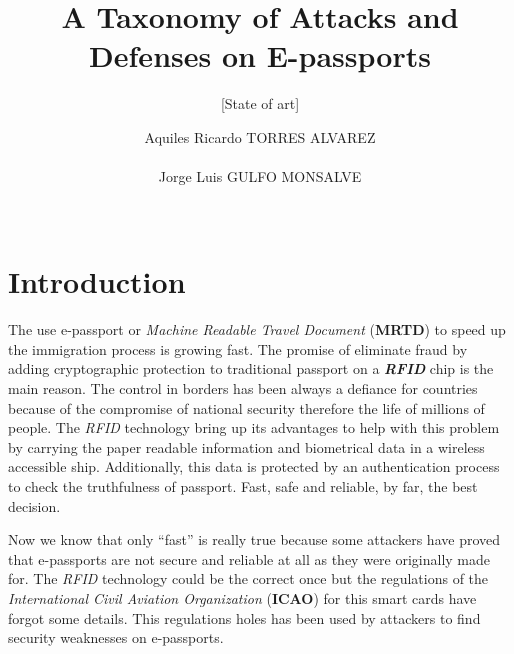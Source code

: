 \documentclass{acm_proc_article-sp}
\begin{document}
\title{A Taxonomy of Attacks and Defenses on E-passports}
\subtitle{[State of art]}

\author{
\alignauthor
Aquiles Ricardo TORRES ALVAREZ%
       \\
       \\
\alignauthor
Jorge Luis GULFO MONSALVE%
       \\
       \\
}

\maketitle
\begin{abstract}

\end{abstract}



\section{Introduction}
The use e-passport or \emph{Machine Readable Travel Document} (\textbf{MRTD}) to speed up the immigration process is growing fast. The promise of eliminate fraud by adding cryptographic protection to traditional passport on a \emph{\textbf{RFID}} chip is the main reason.
The control in borders has been always a defiance for countries because of the compromise of national security therefore the life of millions of people. The \emph{RFID }technology bring up its advantages to help with this problem by carrying the paper readable information and biometrical data in a wireless accessible ship. Additionally, this data is protected by an authentication process to check the truthfulness of passport. Fast, safe and reliable, by far, the best decision. 

Now we know that only “fast” is really true because some attackers have proved that e-passports are not secure and reliable at all as they were originally made for. The \emph{RFID} technology could be the correct once but the regulations of the \emph{International Civil Aviation Organization }(\textbf{ICAO}) for this smart cards have forgot some details. This regulations holes has been used by attackers to find security weaknesses on e-passports.
\end{document}
